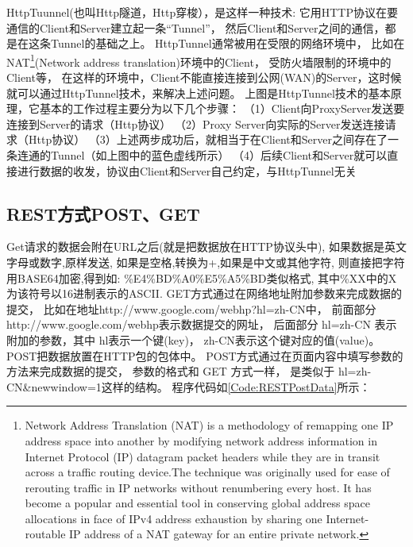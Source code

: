 \documentclass{book}
\begin{document}
HttpTuunnel(也叫Http隧道，Http穿梭），是这样一种技术: 
它用HTTP协议在要通信的Client和Server建立起一条“Tunnel”，
然后Client和Server之间的通信，都是在这条Tunnel的基础之上。
HttpTunnel通常被用在受限的网络环境中，
比如在NAT\footnote{Network Address Translation (NAT) is a methodology 
of remapping one IP address space into another by 
modifying network address information in Internet Protocol (IP) 
datagram packet headers while they are in transit across a 
traffic routing device.The technique was originally used for ease 
of rerouting traffic in IP networks without renumbering every host. 
It has become a popular and essential tool in conserving global 
address space allocations in face of IPv4 address exhaustion 
by sharing one Internet-routable IP address of a NAT gateway 
for an entire private network.}(Network address translation)环境中的Client，
受防火墙限制的环境中的Client等，
在这样的环境中，Client不能直接连接到公网(WAN)的Server，这时候就可以通过HttpTunnel技术，来解决上述问题。
上图是HttpTunnel技术的基本原理，它基本的工作过程主要分为以下几个步骤：
（1）Client向ProxyServer发送要连接到Server的请求（Http协议）
（2）Proxy Server向实际的Server发送连接请求（Http协议）
（3）上述两步成功后，就相当于在Client和Server之间存在了一条连通的Tunnel（如上图中的蓝色虚线所示）
（4）后续Client和Server就可以直接进行数据的收发，协议由Client和Server自己约定，与HttpTunnel无关

\subsection{REST方式POST、GET}

Get请求的数据会附在URL之后(就是把数据放在HTTP协议头中),
如果数据是英文字母或数字,原样发送,
如果是空格,转换为+,如果是中文或其他字符,
则直接把字符用BASE64加密,得到如:
\%E4\%BD\%A0\%E5\%A5\%BD类似格式,
其中\%XX中的X为该符号以16进制表示的ASCII.
GET方式通过在网络地址附加参数来完成数据的提交，
比如在地址http://www.google.com/webhp?hl=zh-CN中，
前面部分http://www.google.com/webhp表示数据提交的网址，
后面部分 hl=zh-CN 表示附加的参数，其中 hl表示一个键(key)， 
zh-CN表示这个键对应的值(value)。POST把数据放置在HTTP包的包体中。
POST方式通过在页面内容中填写参数的方法来完成数据的提交，
参数的格式和 GET 方式一样，
是类似于 hl=zh-CN\&newwindow=1这样的结构。
程序代码如\ref{Code:RESTPostData}所示：
\end{document}
